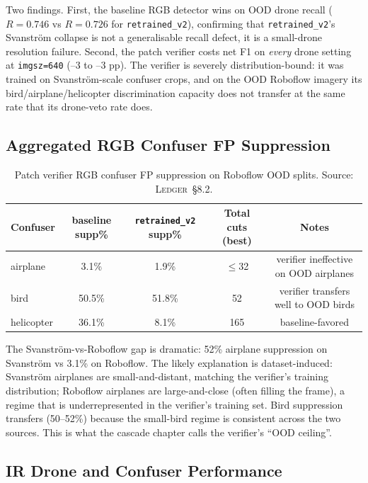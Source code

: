 \documentclass[12pt,a4paper,oneside,openright]{book}
\begin{document}
Two findings. First, the baseline RGB detector wins on OOD drone recall ($R=0.746$ vs $R=0.726$ for \texttt{retrained\_v2}), confirming that \texttt{retrained\_v2}'s Svanstr\"om collapse is not a generalisable recall defect, it is a small-drone resolution failure. Second, the patch verifier costs net F1 on \emph{every} drone setting at \texttt{imgsz=640} (--3 to --3 pp). The verifier is severely distribution-bound: it was trained on Svanstr\"om-scale confuser crops, and on the OOD Roboflow imagery its bird/airplane/helicopter discrimination capacity does not transfer at the same rate that its drone-veto rate does.

\subsection{Aggregated RGB Confuser FP Suppression}

\begin{table}[htbp]
    \centering
    \caption{Patch verifier RGB confuser FP suppression on Roboflow OOD splits. Source: \textsc{Ledger}~\S8.2.}
    \label{tab:ood_rgb_confuser}
    \begin{tabular}{lcccc}
        \toprule
        Confuser & baseline supp\% & \texttt{retrained\_v2} supp\% & Total cuts (best) & Notes \\
        \midrule
        airplane   &  3.1\% &  1.9\% &  $\leq$32 & verifier ineffective on OOD airplanes \\
        bird       & 50.5\% & 51.8\% & 52 & verifier transfers well to OOD birds \\
        helicopter & 36.1\% &  8.1\% & 165 & baseline-favored \\
        \bottomrule
    \end{tabular}
\end{table}

The Svanstr\"om-vs-Roboflow gap is dramatic: 52\% airplane suppression on Svanstr\"om vs 3.1\% on Roboflow. The likely explanation is dataset-induced: Svanstr\"om airplanes are small-and-distant, matching the verifier's training distribution; Roboflow airplanes are large-and-close (often filling the frame), a regime that is underrepresented in the verifier's training set. Bird suppression transfers (50--52\%) because the small-bird regime is consistent across the two sources. This is what the cascade chapter calls the verifier's ``OOD ceiling''.

\subsection{IR Drone and Confuser Performance}
\end{document}
